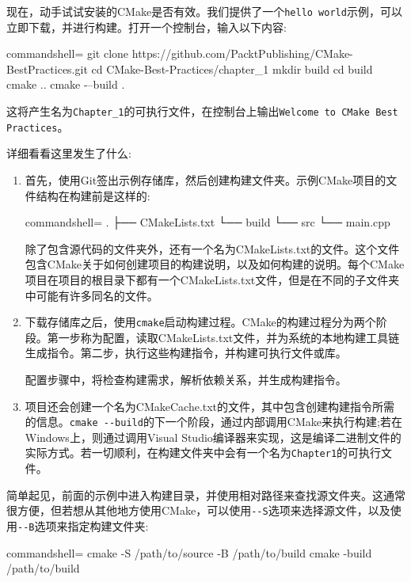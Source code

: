 现在，动手试试安装的CMake是否有效。我们提供了一个\texttt{hello world}示例，可以立即下载，并进行构建。打开一个控制台，输入以下内容:

\begin{tcblisting}{commandshell={}}
git clone https://github.com/PacktPublishing/CMake-BestPractices.git
cd CMake-Best-Practices/chapter_1
mkdir build
cd build
cmake ..
cmake -–build .
\end{tcblisting}

这将产生名为\texttt{Chapter\_1}的可执行文件，在控制台上输出\texttt{Welcome to CMake Best Practices}。

详细看看这里发生了什么:

\begin{enumerate}
\item 
首先，使用Git签出示例存储库，然后创建构建文件夹。示例CMake项目的文件结构在构建前是这样的:

\begin{tcblisting}{commandshell={}}
.
├── CMakeLists.txt
└── build
└── src
      └── main.cpp
\end{tcblisting}

除了包含源代码的文件夹外，还有一个名为CMakeLists.txt的文件。这个文件包含CMake关于如何创建项目的构建说明，以及如何构建的说明。每个CMake项目在项目的根目录下都有一个CMakeLists.txt文件，但是在不同的子文件夹中可能有许多同名的文件。

\item 
下载存储库之后，使用\texttt{cmake}启动构建过程。CMake的构建过程分为两个阶段。第一步称为配置，读取CMakeLists.txt文件，并为系统的本地构建工具链生成指令。第二步，执行这些构建指令，并构建可执行文件或库。

配置步骤中，将检查构建需求，解析依赖关系，并生成构建指令。

\item 
项目还会创建一个名为CMakeCache.txt的文件，其中包含创建构建指令所需的信息。\texttt{cmake -{}-build}的下一个阶段，通过内部调用CMake来执行构建;若在Windows上，则通过调用Visual Studio编译器来实现，这是编译二进制文件的实际方式。若一切顺利，在构建文件夹中会有一个名为\texttt{Chapter1}的可执行文件。
\end{enumerate}

简单起见，前面的示例中进入构建目录，并使用相对路径来查找源文件夹。这通常很方便，但若想从其他地方使用CMake，可以使用\texttt{-{}-S}选项来选择源文件，以及使用\texttt{-{}-B}选项来指定构建文件夹:

\begin{tcblisting}{commandshell={}}
cmake -S /path/to/source -B /path/to/build
cmake -build /path/to/build
\end{tcblisting}

